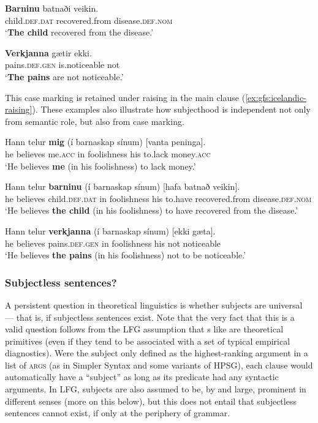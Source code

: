 \documentclass[output=paper]{../langscibook}
\begin{document}
    \ex
    \gll \textbf{Barninu} batnaði veikin.\\
    child.\textsc{def.dat} recovered.from disease.\textsc{def.nom}\\
    \trans `\textbf{The child} recovered from the disease.'
    
    \ex
    \gll \textbf{Verkjanna} gætir ekki.\\
    pains.\textsc{def.gen} is.noticeable not\\
    \trans `\textbf{The pains} are not noticeable.'
    \z
\z
 
\noindent This case marking is retained under raising in the main clause (\ref{ex:gfs:icelandic-raising}). These examples also illustrate how subjecthood is independent not only from semantic role, but also from case marking.
 
 \ea\label{ex:gfs:icelandic-raising}
   \ea
   \gll Hann telur \textbf{mig} (í barnaskap sínum) [vanta peninga].\\
    he believes me.\textsc{acc} in foolishness his to.lack money.\textsc{acc}\\
    \trans `He believes \textbf{me} (in his foolishness) to lack money.'
    
    \ex
    \gll Hann telur \textbf{barninu} (í barnaskap sínum) [hafa batnað veikin].\\
    he believes child.\textsc{def.dat} in foolishness his to.have recovered.from disease.\textsc{def.nom}\\
    \trans `He believes \textbf{the child} (in his foolishness) to have recovered from the disease.'
    
    \ex
    \gll Hann telur \textbf{verkjanna} (í barnaskap sínum) [ekki gæta].\\
    he believes pains.\textsc{def.gen} in foolishness his not noticeable\\
    \trans `He believes \textbf{the pains} (in his foolishness) not to be noticeable.'
   \z
 \z
 
 \subsubsection{Subjectless sentences?\label{sect:gfs:subj-less}}
 
 A persistent question in theoretical linguistics is whether subjects are universal --- that is, if subjectless sentences exist. Note that the very fact that this is a valid question follows from the LFG assumption that {\GF}s like \SUBJ are theoretical primitives (even if they tend to be associated with a set of typical empirical diagnostics). Were the subject only defined as the highest-ranking argument in a list of \textsc{args} (as in Simpler Syntax and some variants of HPSG), each clause would automatically have a ``subject'' as long as its predicate had any syntactic arguments. In LFG, subjects are also assumed to be, by and large, prominent in different senses (more on this below), but this does not entail that subjectless sentences cannot exist, if only at the periphery of grammar.
 
\end{document}
